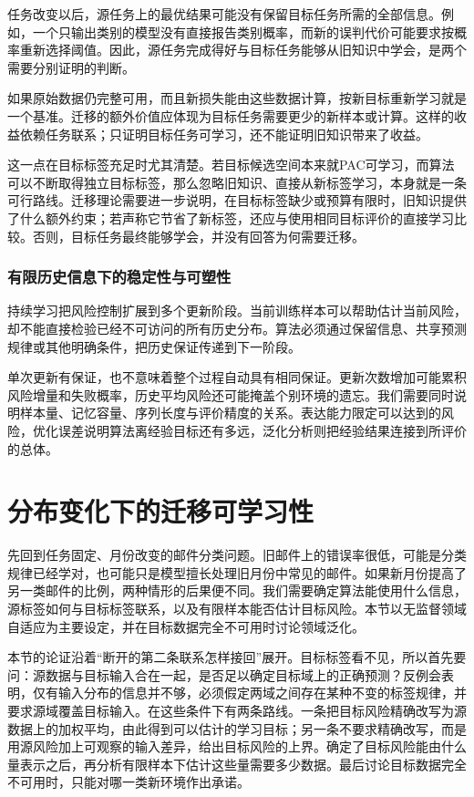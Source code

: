 任务改变以后，源任务上的最优结果可能没有保留目标任务所需的全部信息。例如，一个只输出类别的模型没有直接报告类别概率，而新的误判代价可能要求按概率重新选择阈值。因此，源任务完成得好与目标任务能够从旧知识中学会，是两个需要分别证明的判断。

如果原始数据仍完整可用，而且新损失能由这些数据计算，按新目标重新学习就是一个基准。迁移的额外价值应体现为目标任务需要更少的新样本或计算。这样的收益依赖任务联系；只证明目标任务可学习，还不能证明旧知识带来了收益。

这一点在目标标签充足时尤其清楚。若目标候选空间本来就PAC可学习，而算法可以不断取得独立目标标签，那么忽略旧知识、直接从新标签学习，本身就是一条可行路线。迁移理论需要进一步说明，在目标标签缺少或预算有限时，旧知识提供了什么额外约束；若声称它节省了新标签，还应与使用相同目标评价的直接学习比较。否则，目标任务最终能够学会，并没有回答为何需要迁移。

\subsubsection{有限历史信息下的稳定性与可塑性}

持续学习把风险控制扩展到多个更新阶段。当前训练样本可以帮助估计当前风险，却不能直接检验已经不可访问的所有历史分布。算法必须通过保留信息、共享预测规律或其他明确条件，把历史保证传递到下一阶段。

单次更新有保证，也不意味着整个过程自动具有相同保证。更新次数增加可能累积风险增量和失败概率，历史平均风险还可能掩盖个别环境的遗忘。我们需要同时说明样本量、记忆容量、序列长度与评价精度的关系。表达能力限定可以达到的风险，优化误差说明算法离经验目标还有多远，泛化分析则把经验结果连接到所评价的总体。
\section{分布变化下的迁移可学习性}
\label{sec:domain-adaptation}

先回到任务固定、月份改变的邮件分类问题。旧邮件上的错误率很低，可能是分类规律已经学对，也可能只是模型擅长处理旧月份中常见的邮件。如果新月份提高了另一类邮件的比例，两种情形的后果便不同。我们需要确定算法能使用什么信息，源标签如何与目标标签联系，以及有限样本能否估计目标风险。本节以无监督领域自适应为主要设定，并在目标数据完全不可用时讨论领域泛化。

本节的论证沿着“断开的第二条联系怎样接回”展开。目标标签看不见，所以首先要问：源数据与目标输入合在一起，是否足以确定目标域上的正确预测？反例会表明，仅有输入分布的信息并不够，必须假定两域之间存在某种不变的标签规律，并要求源域覆盖目标输入。在这些条件下有两条路线。一条把目标风险精确改写为源数据上的加权平均，由此得到可以估计的学习目标；另一条不要求精确改写，而是用源风险加上可观察的输入差异，给出目标风险的上界。确定了目标风险能由什么量表示之后，再分析有限样本下估计这些量需要多少数据。最后讨论目标数据完全不可用时，只能对哪一类新环境作出承诺。


